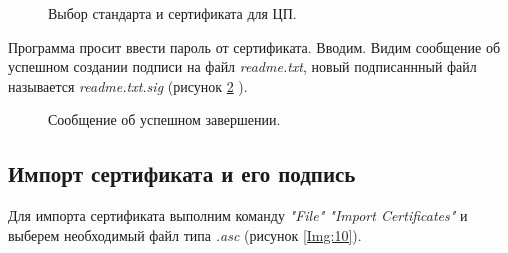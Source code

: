 \documentclass[10pt,a4paper]{report}
\begin{document}
		\begin{figure}[h]
			\caption{Выбор стандарта и сертификата для ЦП.}
			\label{Img:8}
		\end{figure}
		\pagebreak
		
	Программа просит ввести пароль от сертификата. Вводим. Видим сообщение об успешном создании подписи на файл \textit{readme.txt}, новый подписаннный файл называется \textit{readme.txt.sig} (рисунок \ref{Img:9} ).
		
		\begin{figure}[h]
			\caption{Сообщение об успешном завершении.}
			\label{Img:9}
		\end{figure}
		
	\subsection{Импорт сертификата и его подпись}
	Для импорта сертификата выполним команду \textit{"File" "Import Certificates"} и выберем необходимый файл типа \textit{.asc} (рисунок \ref{Img:10}).
		
\end{document}
